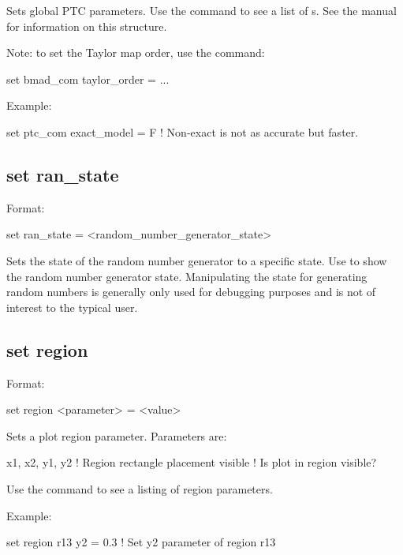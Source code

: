 {{{{{Sets global PTC parameters. Use the  command to see a list of
s. See the \bmad manual for information on this structure.

Note: to set the Taylor map order, use the command:
\begin{example}
  set bmad_com taylor_order = ...
\end{example}

Example:
\begin{example}
  set ptc_com exact_model = F ! Non-exact is not as accurate but faster.
\end{example}


\subsection{set ran\_state}
\label{s:set.ran.state}

Format:
\begin{example}
  set ran_state = <random_number_generator_state>
\end{example}

Sets the state of the random number generator to a specific state. Use 
to show the random number generator state. Manipulating the state for generating random numbers is
generally only used for debugging purposes and is not of interest to the typical user.


\subsection{set region}
\label{s:set.region}

Format:
\begin{example}
  set region <parameter> = <value>
\end{example}

Sets a plot region parameter. Parameters are:
\begin{example}
  x1, x2, y1, y2    ! Region rectangle placement
  visible           ! Is plot in region visible?
\end{example}

Use the  command to see a listing of region parameters.

Example:
\begin{example}
  set region r13 y2 = 0.3  ! Set y2 parameter of region r13
\end{example}

}}}}}
